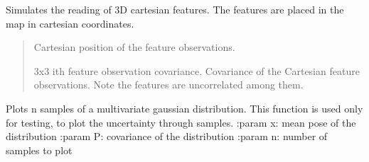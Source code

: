 \documentclass[letterpaper,10pt,english]{sphinxmanual}
\begin{document}
\begin{fulllineitems}
\begin{fulllineitems}
\end{fulllineitems}


\begin{fulllineitems}
\label{\detokenize{robot_simulation:AUV4DOFSimulatedRobot.AUV4DOFSimulatedRobot.ReadCartesian3DFeature}}
\pysigstartsignatures
{}
\pysigstopsignatures
\sphinxAtStartPar
Simulates the reading of 3D cartesian features. The features are placed in the map in cartesian coordinates.
\begin{quote}\begin{description}
\sphinxAtStartPar
\begin{description}
\sphinxAtStartPar
Cartesian position of the feature observations.

\sphinxAtStartPar
3x3 i\sphinxhyphen{}th feature observation covariance.
Covariance of the Cartesian feature observations. Note the features are uncorrelated among them.

\end{description}


\end{description}\end{quote}

\end{fulllineitems}


\begin{fulllineitems}
\label{\detokenize{robot_simulation:AUV4DOFSimulatedRobot.AUV4DOFSimulatedRobot._PlotSample}}
\pysigstartsignatures
{}
\pysigstopsignatures
\sphinxAtStartPar
Plots n samples of a multivariate gaussian distribution. This function is used only for testing, to plot the
uncertainty through samples.
:param x: mean pose of the distribution
:param P: covariance of the distribution
:param n: number of samples to plot

\end{fulllineitems}


\end{fulllineitems}
\end{document}
